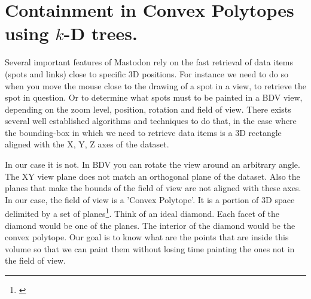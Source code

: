 

\newcommand{\Real}{\ensuremath{\mathbb{R}}}

\newcommand{\set}[1]{\left\{#1\right\}}
\renewcommand{\emptyset}{\varnothing}
\newcommand{\union}{\cup}
\newcommand{\intersect}{\cap}
\newcommand{\Union}{\bigcup}
\newcommand{\Intersect}{\bigcap}

\newcommand{\vc}[1]{\ensuremath{\mathbf{#1}}}
\newcommand{\CalT}{\ensuremath{\mathcal{T}}}
\newcommand{\CalP}{\ensuremath{\mathcal{P}}}
\newcommand{\CalC}{\ensuremath{\mathcal{C}}}

\newcommand{\NOT}{\neg}
\newcommand{\AND}{\wedge}
\newcommand{\OR}{\vee}
\newcommand{\IMPL}{\rightarrow}
\newcommand{\EQU}{\leftrightarrow}
\newcommand{\TRUE}{\mathit{true}}
\newcommand{\FALSE}{\mathit{false}}

\newcommand\trees{\ensuremath{\CalT_k}\xspace}
\newcommand\treemax[2][d]{\ensuremath{\operatorname{max}_{#1}\left(#2\right)}\xspace}
\newcommand\treemin[2][d]{\ensuremath{\operatorname{min}_{#1}\left(#2\right)}\xspace}
\newcommand\kdtrees{\ensuremath{\CalT_{kD}}\xspace}
\newcommand\xmin{\ensuremath{\vc{x}^{\operatorname{min}}\xspace}}
\newcommand\xmax{\ensuremath{\vc{x}^{\operatorname{max}}\xspace}}
\newcommand\xcmin[1]{\ensuremath{x^{\operatorname{min}}_{#1}\xspace}}
\newcommand\xcmax[1]{\ensuremath{x^{\operatorname{max}}_{#1}\xspace}}


\newtheorem{definition}{Definition}%
\newtheorem{proposition}{Proposition}%



\section{Containment in Convex Polytopes using $k$-D trees.}

Several important features of Mastodon rely on the fast retrieval of data items (spots and links) close to specific 3D positions.
For instance we need to do so when you move the mouse close to the drawing of a spot in a view, to retrieve the spot in question. 
Or to determine what spots must to be painted in a BDV view, depending on the zoom level, position, rotation and field of view. 
There exists several well established algorithms and techniques to do that, in the case where the bounding-box in which we need to retrieve data items is a 3D rectangle aligned with the X, Y, Z axes of the dataset. 

In our case it is not.
In BDV you can rotate the view around an arbitrary angle.
The XY view plane does not match an orthogonal plane of the dataset.
Also the planes that make the bounds of the field of view are not aligned with these axes. 
In our case, the field of view is a 'Convex Polytope'.
It is a portion of 3D space delimited by a set of planes\footnote{\href{https://en.wikipedia.org/wiki/Convex_polytope}{}}. 
Think of an ideal diamond.
Each facet of the diamond would be one of the planes. 
The interior of the diamond would be the convex polytope.
Our goal is to know what are the points that are inside this volume so that we can \eg paint them without losing time painting the ones not in the field of view.

